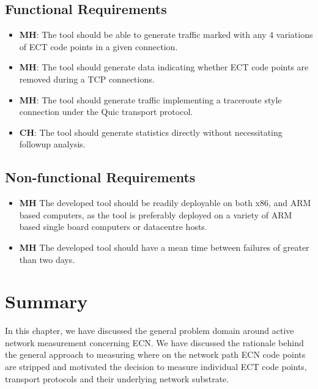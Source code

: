 \documentclass{l4proj}
\begin{document}
\subsection{Functional Requirements}

\begin{itemize}
    \item \textbf{MH}: The tool should be able to generate traffic marked with any 4 variations of ECT code points in a given connection.
    \item \textbf{MH}: The tool should generate data indicating whether ECT code points are removed during a TCP connections.
    \item \textbf{MH}: The tool should generate traffic implementing a traceroute style connection under the Quic transport protocol.
    \item \textbf{CH}: The tool should generate statistics directly without necessitating followup analysis.
\end{itemize}



\subsection{Non-functional Requirements}

\begin{itemize}
    \item \textbf{MH} The developed tool should be readily deployable on both x86, and ARM based computers, as the tool is preferably deployed on a variety of ARM based single board computers or datacentre hosts.
    \item \textbf{MH} The developed tool should have a mean time between failures of greater than two days.
\end{itemize}

\section{Summary}

In this chapter, we have discussed the general problem domain around active network measurement concerning ECN. We have discussed the rationale behind the general approach to measuring where on the network path ECN code points are stripped and motivated the decision to measure individual ECT code points, transport protocols and their underlying network substrate.




\end{document}
